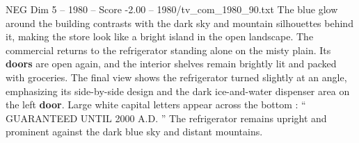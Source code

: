 \begin{textsample}{NEG Dim 5 – 1980 – Score -2.00 – 1980/tv\_com\_1980\_90.txt}
The blue glow around the building contrasts with the dark sky and mountain silhouettes behind it, making the store look like a bright island in the open landscape.
The commercial returns to the refrigerator standing alone on the misty plain.
Its \textbf{doors} are open again, and the interior shelves remain brightly lit and packed with groceries.
The final view shows the refrigerator turned slightly at an angle, emphasizing its side-by-side design and the dark ice-and-water dispenser area on the left \textbf{door}.
Large white capital letters appear across the bottom : “ GUARANTEED UNTIL 2000 A.D. ” The refrigerator remains upright and prominent against the dark blue sky and distant mountains.

\end{textsample}
